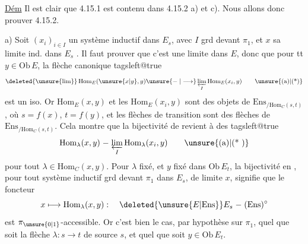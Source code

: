 \uline{Dém}  Il est clair que 4.15.1 est contenu dans 4.15.2 a) et c). Nous allons donc prouver 4.15.2.

a) Soit $(x_i)_{i\in I}$ un système inductif dans $E_s$, avec $I$ grd devant $\pi_1$, et $x$ sa limite ind. dans $E_s$ . Il faut prouver que c'est une limite dans $E$, donc que pour tt $y\in\mathrm{Ob}\,E$, la flèche canonique
{\csname tagsleft@true\endcsname
\[\deleted{\unsure{\lim}}\,\mathrm{Hom}_E(\unsure{x|y},y)\unsure{\relbar|\longrightarrow}\varprojlim_I\mathrm{Hom}_E(x_i,y)\tag*{\unsure{(a)|(*)}}\]}
est un iso. Or $\mathrm{Hom}_E(x,y)$ et les $\mathrm{Hom}_E(x_i,y)$ sont des objets de $\mathrm{Ens}_{/\mathrm{Hom}_C(s,t)}$, où $s=f(x)$, $t=f(y)$, et les flèches de transition sont des flèches de $\mathrm{Ens}_{/\mathrm{Hom}_C(s,t)}$. Cela montre que la bijectivité de  revient à  des
{\csname tagsleft@true\endcsname
\[\mathrm{Hom}_\lambda(x,y)\relbar\varprojlim_I\mathrm{Hom}_\lambda(x_i,y)\tag*{\unsure{(a)|(* )}}\]}
pour tout $\lambda\in\mathrm{Hom}_C(x,y)$. Pour $\lambda$ fixé, et $y$ fixé dans $\mathrm{Ob}\,E_t$, la bijectivité en , pour tout système inductif grd devant $\pi_1$ dans $E_s$, de limite $x$, signifie que le foncteur
\[x\longmapsto\mathrm{Hom}_\lambda(x,y):\quad\deleted{\unsure{E| \mathrm{Ens}}}E_s\relbar(\mathrm{Ens})^\circ\]
est $\pi_{\unsure{0|1}}$-accessible. Or c'est bien le cas, par hypothèse sur $\pi_1$, quel que soit la flèche  $\lambda:s\to t$ de source $s$, et quel que soit $y\in\mathrm{Ob}\,E_t$.

